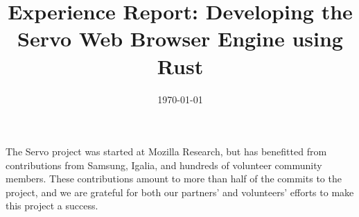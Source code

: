 \documentclass[preprint]{../common/sigplanconf}
\title{Experience Report: Developing the Servo Web Browser Engine using Rust}
\date{\today}
\begin{document}
\maketitle
\thispagestyle{empty}

\sloppy












\acks
The Servo project was started at Mozilla Research, but has benefitted from
contributions from Samsung, Igalia, and hundreds of volunteer community members.
These contributions amount to more than half of the commits to the project,
and we are grateful for both our partners' and volunteers' efforts to make
this project a success.




\end{document}
